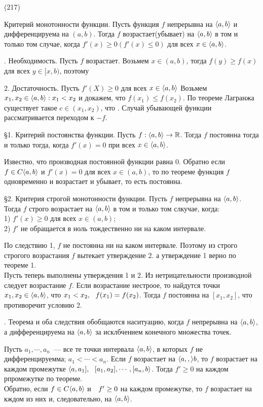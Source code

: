 (217)

\T \q Критерий монотонности функции. Пусть функция $f$ непрерывна на $\langle a, b \rangle$ и дифференцируема на $(a, b)$. Тогда $f$ возрастает(убывает) на $\langle a, b \rangle$ в том и только том случае, когда $f'(x) \ge 0 (f'(x) \le 0)$ для всех $x \in \langle a, b \rangle$.

. Необходимость. Пусть $f$ возрастает. Возьмем $x\in (a, b)$, тогда $f(y)\ge f(x)$ для всех $y \in [x, b)$, поэтому 

2. Достаточность. Пусть $f'(X) \ge 0$ для всех $x \in \langle a, b \rangle$ Возьмем $x_1, x_2 \in \langle a, b \rangle: x_1 < x_2$ и докажем, что $f(x_1) \le f(x_2)$. По теореме Лагранжа существует такое $c \in (x_1, x_2)$, что .
Случай убывающей функции рассматривается переходом к $-f$.

\S1. \q Критерий постоянства функции. Пусть $f: \langle a, b \rangle\to \mathbb{R}$. Тогда $f$ постоянна тогда и только тогда, когда $f'(x) = 0$ при всех $x \in \langle a, b \rangle$.

\D Известно, что производная постоянной функции равна 0. Обратно если $f \in C\langle a, b \rangle$ и $f'(x) = 0$ для всех $x \in (a, b)$, то по теореме функция $f$ одновременно и возрастает и убывает, то есть постоянна.

\S2. \q Критерия строгой монотонности функции. Пусть $f$ непрерывна на $\langle a, b \rangle$. Тогда $f$ строго возрастает на $\langle a, b \rangle$ в том и только том слкучае, когда:\\
1) $f'(x) \ge 0$ для всех $x\in (a, b)$;\\
2) $f'$ не обращается в ноль тождественно ни на каком интервале.

\D По следствию 1, $f$ не постоянна ни на каком интервале. Поэтому из строго строгого возрастания $f$ вытекает утверждение 2. а утверждение 1 верно по теореме 1.\\
Пусть теперь выполнены утверждения 1 и 2. Из нетрицательности производной следует возрастание $f$. Если возрастание нестроое, то найдутся точки $x_1, x_2 \in \langle a, b \rangle$, что $x_ 1 < x_2,\ \  f(x_1) = f(x_2)$. Тогда $f$ постоянна на $[x_1, x_2]$, что противоречит условию 2.

\Zam. Теорема и оба следствия обобщаются наситуацию, когда $f$ непрерывна на $\langle a, b \rangle$, а дифференцируема на $\langle a, b \rangle$ за исклбчением конечного множества точек.

\D Пусть $a_1,\cdots, a_n$~--- все те точки интервала $\langle a, b \rangle$, в которых $f$ не дифференцируемма; $a_1 < \cdots < a_n$. Если $f$ возрастает на $\langle a, , \rangle b$, то $f$ возрастает на каждом промежутке $\langle a, a_1],\ \  [a_1, a_2],\cdots,[a_n, b\rangle$. Тогда $f'\ge 0$ на каждом рпромежутке по теореме.\\
Обратно, если $f \in C\langle a, b \rangle$ и $\ \  f' \ge 0$ на каждом промежутке, то $f$ возрастает на кждом из них и, следовательно, на $\langle a, b \rangle$.